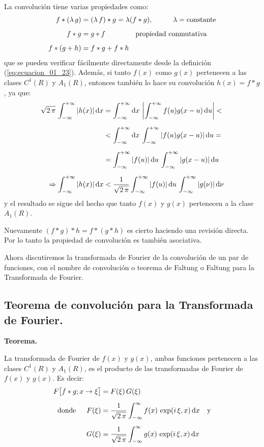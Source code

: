 La convolución tiene varias propiedades como:
\begin{align*}
f * (\lambda \, g) &= (\lambda \, f) * g = \lambda (f * g), \hspace{1cm} \lambda = \mbox{constante} \\[0.5em]
f * g &= g * f \hspace{1.5cm} \mbox{propiedad conmutativa} \\[0.5em]
f * (g + h) &= f * g + f * h
\end{align*}
que se pueden verificar fácilmente directamente desde la definición (\ref{eq:ecuacion_01_23}). \hfill \break 
Además, si tanto $f (x)$ como $g (x)$ pertenecen a las clases $C^{1} (R)$ y $A_{1} (R)$, entonces también lo hace su convolución $h (x) = f * g$, ya que:
\begin{align*}
\sqrt{2 \, \pi} \, \int_{-\infty}^{+\infty} \abs{h(x)} \dd{x} &= \int_{-\infty}^{+\infty} \dd{x} \, \abs{\int_{-\infty}^{+\infty} f(u) g(x - u) \dd{u}} < \\[0.5em]
&< \int_{-\infty}^{+\infty} \dd{x} \, \int_{-\infty}^{+\infty} \abs{f(u) g(x - u)} \dd{u} = \\[0.5em]
&= \int_{-\infty}^{+\infty} \abs{f(u)} \dd{u} \, \int_{-\infty}^{+\infty} \abs{g(x - u)} \dd{u} \\[0.5em]
\Rightarrow \int_{-\infty}^{+\infty} \abs{h(x)} \dd{x} &< \dfrac{1}{\sqrt{2 \, \pi}} \int_{-\infty}^{+\infty} \abs{f(u)} \dd{u} \, \int_{-\infty}^{+\infty} \abs{g(\nu)} \dd{\nu}
\end{align*}
y el resultado se sigue del hecho que tanto $f(x)$ y $g(x)$ pertenecen a la clase $A_{1}(R)$.
\par
Nuevamente $(f * g) * h = f * (g * h)$ es cierto haciendo una revisión directa. Por lo tanto la propiedad de convolución es también asociativa.
\par
Ahora discutiremos la transformada de Fourier de la convolución de un par de funciones, con el nombre de convolución o teorema de Faltung o Faltung para la Transformada de Fourier.

\subsection{Teorema de convolución para la Transformada de Fourier.}

\textbf{Teorema.}

La transformada de Fourier de $f(x)$ y $g(x)$, ambas funciones pertenecen a las clases $C^{1}(R)$ y $A_{1}(R)$, es el producto de las transformadas de Fourier de $f(x)$ y $g(x)$. Es decir:
\begin{align*}
F \big[f * g; x \to \xi \big] &= F(\xi) \, G(\xi) \\[0.5em]
\mbox{donde } \hspace{0.4cm} F(\xi) &= \dfrac{1}{\sqrt{2 \, \pi}} \int_{-\infty}^{\infty} f(x) \, \exp(i \, \xi, x) \dd{x} \hspace{0.3cm} \mbox{y} \\[0.5em]
G(\xi) &= \dfrac{1}{\sqrt{2 \, \pi}} \int_{-\infty}^{\infty} g(x) \, \exp(i \, \xi, x) \dd{x}
\end{align*}

